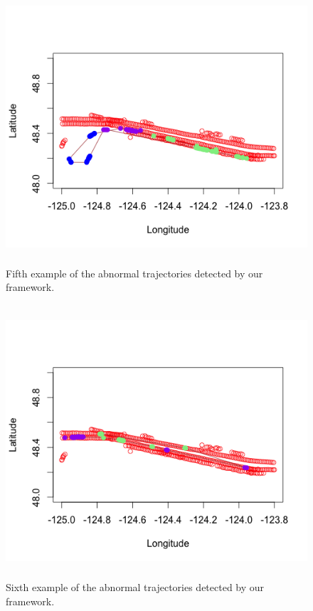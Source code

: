 \documentclass[12pt,glossary]{dalcsthesis}
\begin{document}
\begin{figure}[!hp]
\centering
\includegraphics[width=4.7in, height=4in]{p5.png}
\caption{Fifth example of the abnormal trajectories detected by our framework.}
\label{fig:anomalydetection_tra5}
\end{figure}

\begin{figure}[!hp]
\centering
\includegraphics[width=4.7in, height=4in]{p6.png}
\caption{Sixth example of the abnormal trajectories detected by our framework.}
\label{fig:anomalydetection_tra6}
\end{figure}
\end{document}
